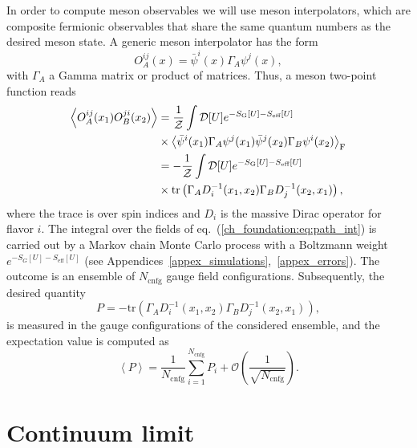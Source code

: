 In order to compute meson observables we will use meson interpolators, which are composite fermionic observables that share the same quantum numbers as the desired meson state. A generic meson interpolator has the form
\begin{equation}
{O}_A^{ij}(x)=\bar{\psi}^i(x)\Gamma_A\psi^j(x),
\end{equation}	
with $\Gamma_A$ a Gamma matrix or product of matrices. Thus, a meson two-point function reads
\begin{align}
\label{ch_foundation:eq:path_int}
\left<{O}_A^{ij}(x_1){O}_B^{ji}(x_2)\right>&=\frac{1}{\mathcal{Z}}\int\mathcal{D}[U]e^{-S_{\textrm G}[U]-S_{\textrm{eff}}[U]}\notag\\
&\times\left<\bar{\psi}^i(x_1)\Gamma_A\psi^j(x_1)\bar{\psi}^j(x_2)\Gamma_B\psi^i(x_2)\right>_{\textrm F}  \\
&=-\frac{1}{\mathcal{Z}}\int\mathcal{D}[U]e^{-S_{\textrm G}[U]-S_{\textrm{eff}}[U]}\notag\\
&\times{\textrm{tr}}\left(\Gamma_AD_i^{-1}(x_1,x_2)\Gamma_BD_j^{-1}(x_2,x_1)\right),
\end{align}
where the trace is over spin indices and $D_i$ is the massive Dirac operator for flavor $i$. The integral over the fields of eq.~(\ref{ch_foundation:eq:path_int}) is carried out by a Markov chain Monte Carlo process with a Boltzmann weight 
$e^{-S_G[U]-S_{\textrm{eff}}[U]}$ (see Appendices~\ref{appex_simulations},~\ref{appex_errors}). The outcome is an ensemble  of $N_{\textrm{cnfg}}$ gauge field configurations. Subsequently, the desired quantity
\begin{equation}
P=-{\textrm{tr}}\left(\Gamma_A D_i^{-1}(x_1,x_2)\Gamma_B D_j^{-1}(x_2,x_1)\right),
\end{equation}
is measured in the gauge configurations of the considered ensemble, and the expectation value is computed as
\begin{equation}
\left<P\right>=\frac{1}{N_{\textrm{cnfg}}}\sum_{i=1}^{N_{\textrm{cnfg}}}P_i+\mathcal{O}\left(\frac{1}{\sqrt{N_{\textrm{cnfg}}}}\right).
\end{equation}



\section{Continuum limit}
\label{ch_foundation:sec:continuum-limit}

